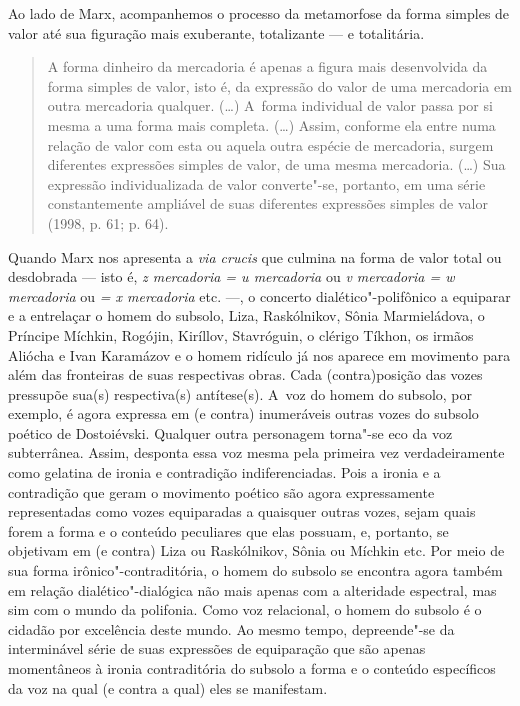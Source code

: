Ao lado de Marx, acompanhemos o processo da metamorfose da forma simples
de valor até sua figuração mais exuberante, totalizante --- e
totalitária.

\begin{quote}
A forma dinheiro da mercadoria é apenas a figura mais desenvolvida da
forma simples de valor, isto é, da expressão do valor de uma mercadoria
em outra mercadoria qualquer. (\ldots) A~forma individual de valor passa
por si mesma a uma forma mais completa. (\ldots) Assim, conforme ela entre
numa relação de valor com esta ou aquela outra espécie de mercadoria,
surgem diferentes expressões simples de valor, de uma mesma mercadoria.
(\ldots) Sua expressão individualizada de valor converte"-se, portanto, em
uma série constantemente ampliável de suas diferentes expressões simples
de valor (1998, p. 61; p. 64).
\end{quote}

Quando Marx nos apresenta a \emph{via crucis} que culmina na forma de
valor total ou desdobrada --- isto é, \emph{z mercadoria  = u mercadoria
} ou \emph{v mercadoria  = w mercadoria } ou \emph{= x mercadoria }
etc. ---, o concerto dialético"-polifônico a equiparar e a entrelaçar o
homem do subsolo, Liza, Raskólnikov, Sônia Marmieládova, o Príncipe
Míchkin, Rogójin, Kiríllov, Stavróguin, o clérigo Tíkhon, os irmãos
Aliócha e Ivan Karamázov e o homem ridículo já nos aparece em movimento
para além das fronteiras de suas respectivas obras. Cada (contra)posição
das vozes pressupõe sua(s) respectiva(s) antítese(s). A~voz do homem do
subsolo, por exemplo, é agora expressa em (e contra) inumeráveis outras
vozes do subsolo poético de Dostoiévski. Qualquer outra personagem
torna"-se eco da voz subterrânea. Assim, desponta essa voz mesma pela
primeira vez verdadeiramente como gelatina de ironia e contradição
indiferenciadas. Pois a ironia e a contradição que geram o movimento
poético são agora expressamente representadas como vozes equiparadas a
quaisquer outras vozes, sejam quais forem a forma e o conteúdo
peculiares que elas possuam, e, portanto, se objetivam em (e contra)
Liza ou Raskólnikov, Sônia ou Míchkin etc. Por meio de sua forma
irônico"-contraditória, o homem do subsolo se encontra agora também em
relação dialético"-dialógica não mais apenas com a alteridade espectral,
mas sim com o mundo da polifonia. Como voz relacional, o homem do
subsolo é o cidadão por excelência deste mundo. Ao mesmo tempo,
depreende"-se da interminável série de suas expressões de equiparação que
são apenas momentâneos à ironia contraditória do subsolo a forma e o
conteúdo específicos da voz na qual (e contra a qual) eles se
manifestam.

